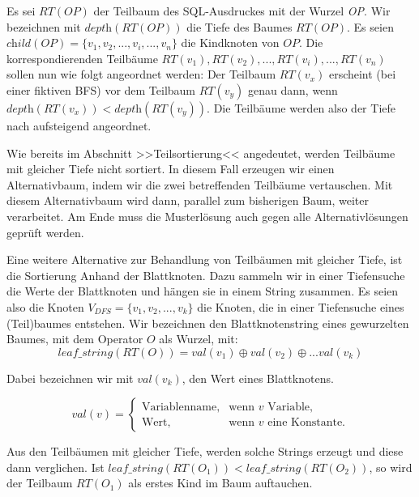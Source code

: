 Es sei $\textit{RT}(\textit{OP})$ der Teilbaum des SQL-Ausdruckes mit der Wurzel \textit{OP}. Wir bezeichnen mit $\textit{depth}(\textit{RT}(\textit{OP}))$ die Tiefe des Baumes $\textit{RT}(\textit{OP})$. Es seien $\textit{child}(\textit{OP}) = \{v_1,v_2,...,v_i,...,v_n\}$ die Kindknoten von $\textit{OP}$. Die korrespondierenden Teilbäume $\textit{RT}(v_1),\textit{RT}(v_2),...,\textit{RT}(v_i),...,\textit{RT}(v_n)$ sollen nun wie folgt angeordnet werden: Der Teilbaum $\textit{RT}(v_x)$ erscheint (bei einer fiktiven BFS) vor dem Teilbaum $\textit{RT}(v_y)$ genau dann, wenn $\textit{depth}(\textit{RT}(v_x)) <  \textit{depth}(\textit{RT}(v_y))$. Die Teilbäume werden also der Tiefe nach aufsteigend angeordnet. 

Wie bereits im Abschnitt >>Teilsortierung<< angedeutet, werden Teilbäume mit gleicher Tiefe nicht sortiert. In diesem Fall erzeugen wir einen Alternativbaum, indem wir die zwei betreffenden Teilbäume vertauschen. Mit diesem Alternativbaum wird dann, parallel zum bisherigen Baum, weiter verarbeitet. Am Ende muss die Musterlösung auch gegen alle Alternativlösungen geprüft werden.

Eine weitere Alternative zur Behandlung von Teilbäumen mit gleicher Tiefe, ist die Sortierung Anhand der Blattknoten. Dazu sammeln wir in einer Tiefensuche die Werte der Blattknoten und hängen sie in einem String zusammen. Es seien also die Knoten $V_{DFS} = \{v_1,v_2,...,v_k\}$ die Knoten, die in einer Tiefensuche eines (Teil)baumes entstehen. Wir bezeichnen den Blattknotenstring eines gewurzelten Baumes, mit dem Operator $O$ als Wurzel, mit: $$\mathit{leaf\_string}(RT(O)) = \mathit{val}(v_1) \oplus \mathit{val}(v_2) \oplus ... \mathit{val}(v_k)$$

Dabei bezeichnen wir mit $\mathit{val}(v_k)$, den Wert eines Blattknotens.

$$
val(v)=\begin{cases}
  \text{Variablenname},  & \text{wenn }v\text{ Variable,}\\
  \text{Wert}, & \text{wenn }v\text{ eine Konstante.}
\end{cases}
$$

Aus den Teilbäumen mit gleicher Tiefe, werden solche Strings erzeugt und diese dann verglichen.
Ist $\mathit{leaf\_string}(RT(O_1)) <  \mathit{leaf\_string}(RT(O_2))$, so wird der Teilbaum $RT(O_1)$ als erstes Kind im Baum auftauchen.

